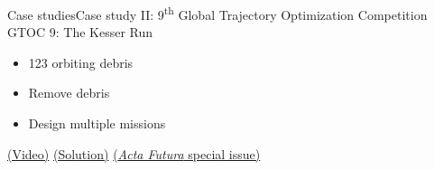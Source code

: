 \documentclass[10pt,compress]{beamer} %
\begin{document}
{\begin{frame}{Case studies}{Case study II: 9\textsuperscript{th} Global Trajectory Optimization Competition}
    GTOC 9: The Kesser Run
    \begin{itemize}
        \item 123 orbiting debris
        \item Remove debris
        \item Design multiple missions
    \end{itemize}
    \href{https://www.youtube.com/watch?v=zvxZx-QnqQ0}{(Video)}
    \href{https://www.youtube.com/watch?v=5CQNG6OIbZM}{(Solution)}
	\href{https://www.esa.int/gsp/ACT/acta_futura/issue11/}{(\textit{Acta Futura} special issue)}
\end{frame}

}{}
\end{document}
